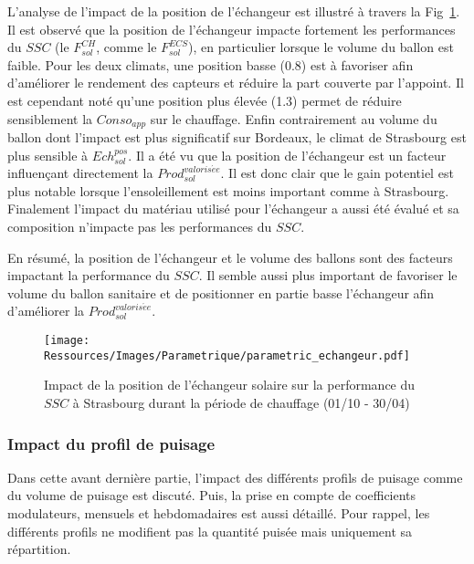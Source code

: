 L’analyse de l’impact de la position de l’échangeur est illustré à travers la
Fig~\ref{fig:impact_pos_ech}. Il est observé que la position de l’échangeur impacte
fortement les performances du $SSC$ (le $F_{sol}^{CH}$, comme le $F_{sol}^{ECS}$), en particulier
lorsque le volume du ballon est faible. Pour les deux climats, une position basse
(\num{0.8}) est à favoriser afin d’améliorer le rendement des capteurs et réduire la part
couverte par l’appoint. Il est cependant noté qu’une position plus élevée (\num{1.3})
permet de réduire sensiblement la $Conso_{app}$ sur le chauffage.
Enfin contrairement au volume du ballon dont l’impact est plus significatif sur Bordeaux, le
climat de Strasbourg est plus sensible à $Ech_{sol}^{pos}$. Il a été vu que la position de l’échangeur
est un facteur influençant directement la $Prod_{sol}^{valoris\acute ee}$. Il est donc clair que le gain potentiel
est plus notable lorsque l’ensoleillement est moins important comme à Strasbourg.
Finalement l’impact du matériau utilisé pour l’échangeur a aussi été évalué et sa
composition n’impacte pas les performances du $SSC$.

En résumé, la position de l’échangeur et le volume des ballons sont des facteurs
impactant la performance du $SSC$. Il semble aussi plus important de favoriser
le volume du ballon sanitaire et de positionner en partie basse l’échangeur afin
d’améliorer la $Prod_{sol}^{valoris\acute ee}$.

\begin{figure}
    \begin{center}
        \texttt{[image: Ressources/Images/Parametrique/parametric\_echangeur.pdf]}
    \end{center}
    \caption{Impact de la position de l’échangeur solaire sur la performance
             du $SSC$ à Strasbourg durant la période de chauffage (01/10 - 30/04)
             \label{fig:impact_pos_ech}}
\end{figure}


\subsubsection{Impact du profil de puisage} %
\label{ssub:impact_du_profil_de_puisage}
Dans cette avant dernière partie, l’impact des différents profils de puisage comme du
volume de puisage est discuté. Puis, la prise en compte de coefficients modulateurs,
mensuels et hebdomadaires est aussi détaillé. Pour rappel, les différents profils ne
modifient pas la quantité puisée mais uniquement sa répartition.

